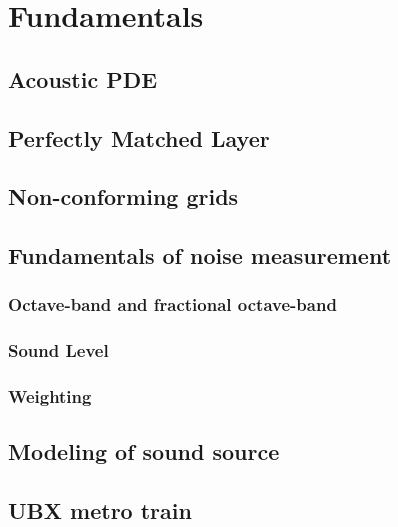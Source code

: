 \chapter{Fundamentals}
\label{chap:Theory}

\section{Acoustic PDE}
\section{Perfectly Matched Layer}
\section{Non-conforming grids}
\section{Fundamentals of noise measurement}
\subsection{Octave-band and fractional octave-band}
\subsection{Sound Level}
\subsection{Weighting}
\section{Modeling of sound source}
\section{UBX metro train}